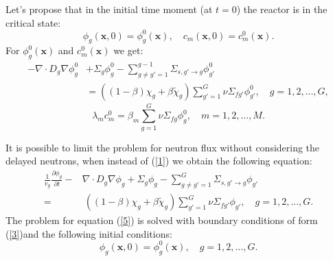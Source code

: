\documentclass[authoryear]{elsarticle}
\begin{document}
Let’s propose that in the initial time moment (at $t=0$) the reactor is in the critical state:
\begin{equation}\label{4}
 \phi_g(\bm x,0) = \phi_g^0(\bm x), 
 \quad c_m(\bm x,0) = c_m^0(\bm x) . 
\end{equation} 
For $\phi_g^0(\bm x)$ and $c_m^0(\bm x)$ we get:
\[
 \begin{split}
 - \nabla \cdot D_g \nabla \phi_g^0 & + \Sigma_g \phi_g^0 
 - \sum_{g\neq g'=1}^{g-1} \Sigma_{s,g'\rightarrow g} \phi_{g'}^0 \\
 & = ( (1-\beta) \chi_g + \beta \widetilde{\chi}_g) \sum_{g'=1}^{G} \nu \Sigma_{fg'} \phi_{g'}^0 , \quad 
 g = 1,2, ..., G ,
\end{split}
\] 
\[
 \lambda_m c_m^0 = \beta_m \sum_{g=1}^{G} \nu \Sigma_{fg} \phi_g^0 ,
 \quad m = 1,2, ..., M .
\] 

It is possible to limit the problem for neutron flux without considering the delayed neutrons, when instead of  (\ref{1}) we obtain the following equation:
 \begin{equation}\label{5}
\begin{split}
 \frac{1}{v_g} \frac{\partial \phi_g}{\partial t} - & \nabla \cdot D_g \nabla \phi_g + \Sigma_g \phi_g 
 - \sum_{g\neq g'=1}^{G} \Sigma_{s,g'\rightarrow g} \phi_{g'} \\
 =  & \ ( (1-\beta) \chi_g + \beta \widetilde{\chi}_g) \sum_{g'=1}^{G} \nu \Sigma_{fg'} \phi_{g'} , \quad 
 g = 1,2, ..., G .
\end{split}
\end{equation} 
The problem for equation (\ref{5}) is solved with boundary conditions of form (\ref{3})and the following initial conditions:
\begin{equation}\label{6}
 \phi_g(\bm x,0) = \phi_g^0(\bm x), 
 \quad  g = 1,2, ..., G .
\end{equation} 
\end{document}

